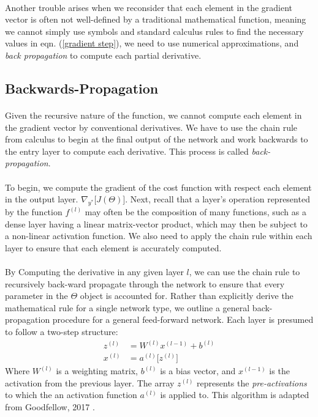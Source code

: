 \documentclass[12pt,letterpaper]{article}
\begin{document}
\paragraph*{}Another trouble arises when we reconsider that each element in the gradient vector is often not well-defined by a traditional mathematical function, meaning we cannot simply use symbols and standard calculus rules to find the necessary values in eqn. (\ref{gradient step}), we need to use numerical approximations, and \textit{back propagation} to compute each partial derivative. 

\subsection{Backwards-Propagation}

\paragraph*{}Given the recursive nature of the function, we cannot compute each element in the gradient vector by conventional derivatives. We have to use the chain rule from calculus to  begin at the final output of the network and work backwards to the entry layer to compute each derivative. This process is called \textit{back-propagation}. 

\paragraph*{}To begin, we compute the gradient of the cost function with respect each element in the output layer. $\nabla_{y^*}\big[J(\Theta)\big]$. Next, recall that a layer's operation represented by the function $f^{(l)}$ may often be the composition of many functions, such as a dense layer having a linear matrix-vector product, which may then be subject to a non-linear activation function. We also need to apply the chain rule within each layer to ensure that each element is accurately computed.

\paragraph*{}By Computing the derivative in any given layer $l$, we can use the chain rule to recursively back-ward propagate through the network to ensure that every parameter in the $\Theta$ object is accounted for. Rather than explicitly derive the mathematical rule for a single network type, we outline a general back-propagation procedure for a general feed-forward network. Each layer is presumed to follow a two-step structure:
\begin{equation}
\begin{split}
z^{(l)} &=  W^{(l)} x^{(l-1)} + b^{(l)} \\
x^{(l)} &= a^{(l)} \big[ z^{(l)} \big]
\end{split}
\end{equation}
Where $W^{(l)}$ is a weighting matrix, $b^{(l)}$ is a bias vector, and $x^{(l-1)}$ is the activation from the previous layer. The array $z^{(l)}$ represents the \textit{pre-activations} to which the an activation function $a^{(l)}$ is applied to. This algorithm is adapted from Goodfellow, 2017 \cite{Goodfellow}.
\end{document}
